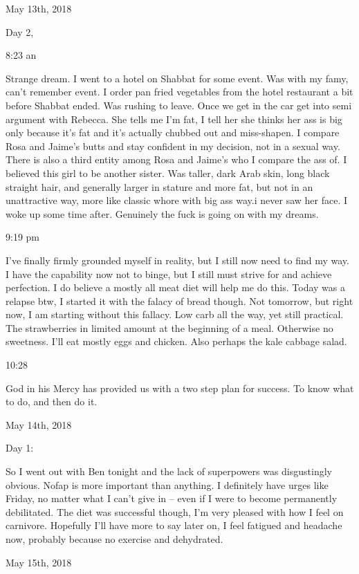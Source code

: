 \bigskip
\bigskip
May 13th, 2018

Day 2,

8:23 an

Strange dream. I went to a hotel on Shabbat for some event. Was with my
famy, can't remember event. I order pan fried vegetables from the hotel
restaurant a bit before Shabbat ended. Was rushing to leave. Once we get
in the car get into semi argument with Rebecca. She tells me I'm fat, I
tell her she thinks her ass is big only because it's fat and it's
actually chubbed out and miss-shapen. I compare Rosa and Jaime's butts
and stay confident in my decision, not in a sexual way. There is also a
third entity among Rosa and Jaime's who I compare the ass of. I believed
this girl to be another sister. Was taller, dark Arab skin, long black
straight hair, and generally larger in stature and more fat, but not in
an unattractive way, more like classic whore with big ass way.i never
saw her face. I woke up some time after. Genuinely the fuck is going on
with my dreams.

9:19 pm

I've finally firmly grounded myself in reality, but I still now need to
find my way. I have the capability now not to binge, but I still must
strive for and achieve perfection. I do believe a mostly all meat diet
will help me do this. Today was a relapse btw, I started it with the
falacy of bread though. Not tomorrow, but right now, I am starting
without this fallacy. Low carb all the way, yet still practical. The
strawberries in limited amount at the beginning of a meal. Otherwise no
sweetness. I'll eat mostly eggs and chicken. Also perhaps the kale
cabbage salad.

10:28

God in his Mercy has provided us with a two step plan for success. To
know what to do, and then do it.

\bigskip
\bigskip
May 14th, 2018

Day 1:

So I went out with Ben tonight and the lack of superpowers was
disgustingly obvious. Nofap is more important than anything. I
definitely have urges like Friday, no matter what I can't give in --
even if I were to become permanently debilitated. The diet was
successful though, I'm very pleased with how I feel on carnivore.
Hopefully I'll have more to say later on, I feel fatigued and headache
now, probably because no exercise and dehydrated.

\bigskip
\bigskip
May 15th, 2018


